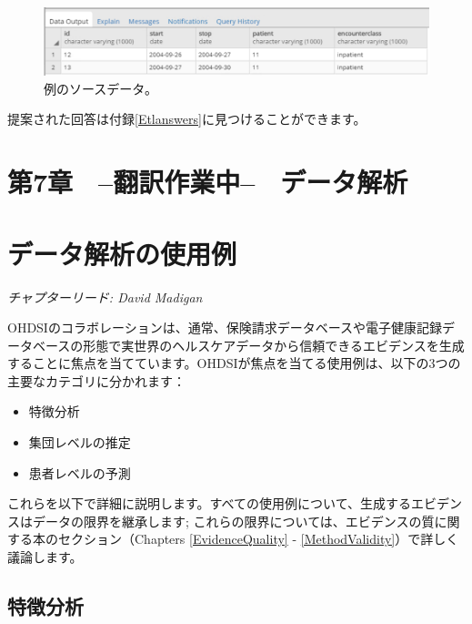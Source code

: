 \documentclass[
  11pt]{book}
\providecommand{\tightlist}{%
  \setlength{\itemsep}{0pt}\setlength{\parskip}{0pt}}
\theoremstyle{definition}
\theoremstyle{definition}
\theoremstyle{definition}
\theoremstyle{definition}
\theoremstyle{remark}
\begin{document}
\begin{figure}

{\centering \includegraphics[width=1\linewidth]{images/ExtractTransformLoad/exerciseSourceData} 

}

\caption{例のソースデータ。}\label{fig:exerciseSourceData}
\end{figure}

提案された回答は付録\ref{Etlanswers}に見つけることができます。

\chapter*{第7章　--翻訳作業中--　データ解析}\label{ux7b2c7ux7ae0-ux7ffbux8a33ux4f5cux696dux4e2d-ux30c7ux30fcux30bfux89e3ux6790}

\chapter{データ解析の使用例}\label{DataAnalyticsUseCases}

\emph{チャプターリード: David Madigan}

OHDSIのコラボレーションは、通常、保険請求データベースや電子健康記録データベースの形態で実世界のヘルスケアデータから信頼できるエビデンスを生成することに焦点を当てています。OHDSIが焦点を当てる使用例は、以下の3つの主要なカテゴリに分かれます：

\begin{itemize}
\tightlist
\item
  特徴分析
\item
  集団レベルの推定
\item
  患者レベルの予測
\end{itemize}

これらを以下で詳細に説明します。すべての使用例について、生成するエビデンスはデータの限界を継承します; これらの限界については、エビデンスの質に関する本のセクション（Chapters \ref{EvidenceQuality} - \ref{MethodValidity}）で詳しく議論します。

\section{特徴分析}\label{ux7279ux5fb4ux5206ux6790}
\end{document}
